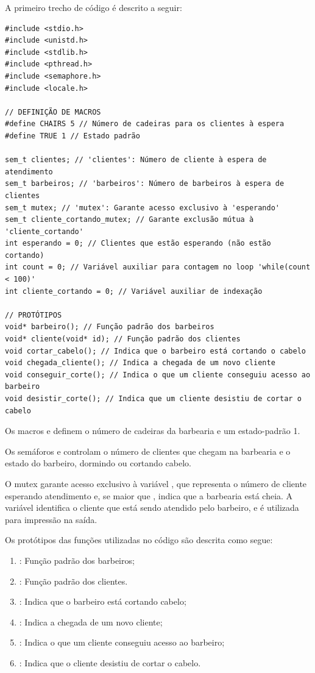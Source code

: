 \documentclass[
	12pt,				%
	openright,			%
	oneside,			%
	a4paper,			%
	chapter=TITLE,		%
	english,			%
	french,				%
	spanish,			%
	brazil				%
	]{abntex2}
\theoremstyle{definition}
\begin{document}
A primeiro trecho de código é descrito a seguir:
\begin{verbatim}
#include <stdio.h>
#include <unistd.h>
#include <stdlib.h>
#include <pthread.h>
#include <semaphore.h>
#include <locale.h>

// DEFINIÇÃO DE MACROS
#define CHAIRS 5 // Número de cadeiras para os clientes à espera
#define TRUE 1 // Estado padrão

sem_t clientes; // 'clientes': Número de cliente à espera de atendimento 
sem_t barbeiros; // 'barbeiros': Número de barbeiros à espera de clientes 
sem_t mutex; // 'mutex': Garante acesso exclusivo à 'esperando'
sem_t cliente_cortando_mutex; // Garante exclusão mútua à 'cliente_cortando'
int esperando = 0; // Clientes que estão esperando (não estão cortando) 
int count = 0; // Variável auxiliar para contagem no loop 'while(count < 100)'
int cliente_cortando = 0; // Variável auxiliar de indexação

// PROTÓTIPOS
void* barbeiro(); // Função padrão dos barbeiros
void* cliente(void* id); // Função padrão dos clientes
void cortar_cabelo(); // Indica que o barbeiro está cortando o cabelo
void chegada_cliente(); // Indica a chegada de um novo cliente
void conseguir_corte(); // Indica o que um cliente conseguiu acesso ao barbeiro
void desistir_corte(); // Indica que um cliente desistiu de cortar o cabelo
\end{verbatim}

Os macros  e  definem o número de cadeiras da barbearia e um estado-padrão 1.

Os semáforos  e  controlam o número de clientes que chegam na barbearia e o estado do barbeiro, dormindo ou cortando cabelo.

O mutex  garante acesso exclusivo à variável , que representa o número de cliente esperando atendimento e, se maior que , indica que a barbearia está cheia. A variável  identifica o cliente que está sendo atendido pelo barbeiro, e é utilizada para impressão na saída.

Os protótipos das funções utilizadas no código são descrita como segue:

\begin{enumerate}
    \item {}: Função padrão dos barbeiros;
    \item {}: Função padrão dos clientes.
    \item {}: Indica que o barbeiro está cortando cabelo;
    \item {}: Indica a chegada de um novo cliente;
    \item {}: Indica o que um cliente conseguiu acesso ao barbeiro;
    \item {}: Indica que o cliente desistiu de cortar o cabelo.
\end{enumerate}
\end{document}
